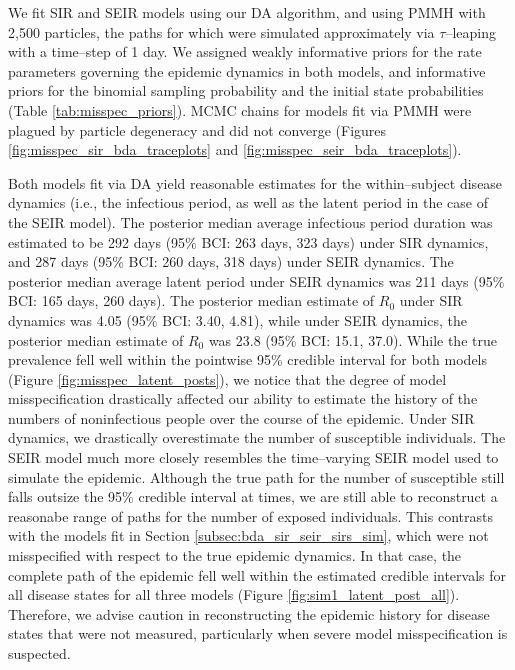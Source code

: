 We fit SIR and SEIR models using our DA algorithm, and using PMMH with 2,500 particles, the paths for which were simulated approximately via $ \tau $--leaping with a time--step of 1 day. We assigned weakly informative priors for the rate parameters governing the epidemic dynamics in both models, and informative priors for the binomial sampling probability and the initial state probabilities (Table \ref{tab:misspec_priors}). MCMC chains for models fit via PMMH were plagued by particle degeneracy and did not converge (Figures \ref{fig:misspec_sir_bda_traceplots} and \ref{fig:misspec_seir_bda_traceplots}).

Both models fit via DA yield reasonable estimates for the within--subject disease dynamics (i.e., the infectious period, as well as the latent period in the case of the SEIR model). The posterior median average infectious period duration was estimated to be 292 days (95\% BCI: 263 days, 323 days) under SIR dynamics, and 287 days (95\% BCI: 260 days, 318 days) under SEIR dynamics. The posterior median average latent period under SEIR dynamics was 211 days (95\% BCI: 165 days, 260 days). The posterior median estimate of $ R_0 $ under SIR dynamics was 4.05 (95\% BCI: 3.40, 4.81), while under SEIR dynamics, the posterior median estimate of $ R_0 $ was 23.8 (95\% BCI: 15.1, 37.0). While the true prevalence fell well within the pointwise 95\% credible interval for both models (Figure \ref{fig:misspec_latent_posts}), we notice that the degree of model misspecification drastically affected our ability to estimate the history of the numbers of noninfectious people over the course of the epidemic. Under SIR dynamics, we drastically overestimate the number of susceptible individuals. The SEIR model much more closely resembles the time--varying SEIR model used to simulate the epidemic. Although the true path for the number of susceptible still falls outsize the 95\% credible interval at times, we are still able to reconstruct a reasonabe range of paths for the number of exposed individuals. This contrasts with the models fit in Section \ref{subsec:bda_sir_seir_sirs_sim}, which were not misspecified with respect to the true epidemic dynamics. In that case, the complete path of the epidemic fell well within the estimated credible intervals for all disease states for all three models (Figure \ref{fig:sim1_latent_post_all}). Therefore, we advise caution in  reconstructing the epidemic history for disease states that were not measured, particularly when severe model misspecification is suspected.

